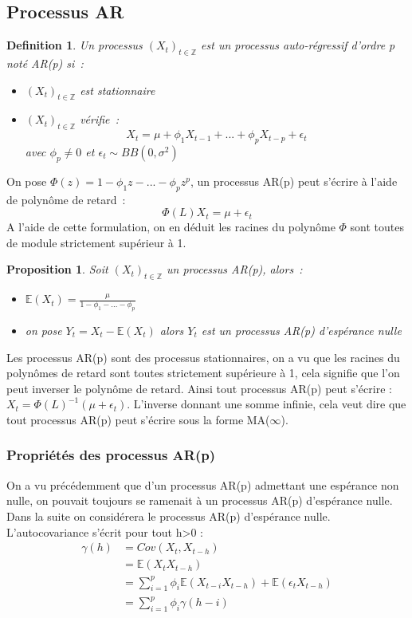 \documentclass[11pt]{scrartcl} %
\newtheorem{Def}[theorem]{Definition}
\newtheorem{pro}[theorem]{Proposition}
\newcommand{\Xt}{\left(X_t\right)_{t\in\mathbb{Z}}}
\begin{document}
\subsection{Processus AR}
\begin{Def}
Un processus $\Xt$ est un processus auto-régressif d'ordre p noté AR(p) si~:
\begin{itemize}
\item[i)] $\Xt$ est stationnaire
\item[ii)] $\Xt$ vérifie~:
$$
X_t = \mu + \phi_1X_{t-1}+...+\phi_pX_{t-p}+\epsilon_t
$$
avec $\phi_p\not=0$ et $\epsilon_t\sim BB(0,\sigma^2)$
\end{itemize}
\end{Def}
On pose $\Phi(z)=1-\phi_1z-...-\phi_pz^p$, un processus AR(p) peut s'écrire à l'aide de polynôme de retard~:
$$
\Phi(L)X_t = \mu + \epsilon_t
$$
A l'aide de cette formulation, on en déduit les racines du polynôme $\Phi$ sont toutes de module strictement supérieur à 1.
\begin{pro}
Soit $\Xt$ un processus AR(p), alors~:
\begin{itemize}
\item $\mathbb{E}\left(X_t\right) = \frac{\mu}{1-\phi_1-...-\phi_p}$\\
\item on pose $Y_t=X_t-\mathbb{E}\left(X_t\right)$ alors $Y_t$ est un processus AR(p) d'espérance nulle
\end{itemize}
\end{pro}
Les processus AR(p) sont des processus stationnaires, on a vu que les racines du polynômes de retard sont toutes strictement supérieure à 1, cela signifie que l'on peut inverser le polynôme de retard. Ainsi tout processus AR(p) peut s'écrire : $X_t = \Phi(L)^{-1}\left(\mu + \epsilon_t\right)$. L'inverse donnant une somme infinie, cela veut dire que tout processus AR(p) peut s'écrire sous la forme MA($\infty$).

\subsubsection{Propriétés des processus AR(p)}
On a vu précédemment que d'un processus AR(p) admettant une espérance non nulle, on pouvait toujours se ramenait à un processus AR(p) d'espérance nulle. Dans la suite on considérera le processus AR(p) d'espérance nulle. L'autocovariance s'écrit pour tout h>0 : 
\begin{align*}
\gamma(h)&= Cov(X_t,X_{t-h})\\
&= \mathbb{E}\left(X_tX_{t-h}\right)\\
&= \sum_{i=1}^p\phi_i\mathbb{E}\left(X_{t-i}X_{t-h}\right)+\mathbb{E}\left(\epsilon_tX_{t-h}\right)\\
&= \sum_{i=1}^p\phi_i\gamma(h-i)
\end{align*}
\end{document}
